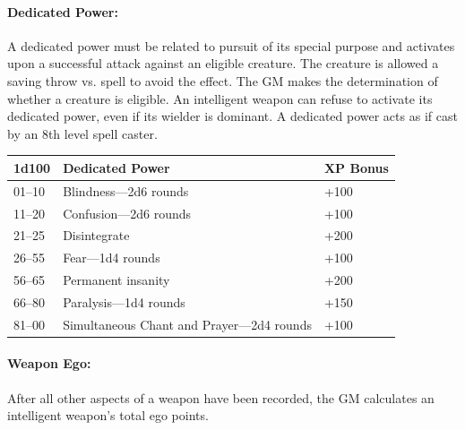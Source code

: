 \begin{multicols}{2}
\paragraph{Dedicated Power:} A dedicated power must be related to pursuit of its special purpose and activates upon a successful attack against an eligible creature.  The creature is allowed a saving throw vs. spell to avoid the effect.  The GM makes the determination of whether a creature is eligible.  An intelligent weapon can refuse to activate its dedicated power, even if its wielder is dominant.  A dedicated power acts as if cast by an 8th level spell caster.

\noindent \begin{minipage}{\columnwidth}

\label{dedicatedpowers}
\noindent \begin{tabular}{|p{}|p{}|p{}|}
\hline
1d100	& Dedicated Power	& XP Bonus \\
\hline\hline
\rowcolor[gray]{0.9}01--10	& Blindness---2d6 rounds	& +100 \\
11--20	& Confusion---2d6 rounds	& +100 \\
\rowcolor[gray]{0.9}21--25	& Disintegrate	& +200 \\
26--55	& Fear---1d4 rounds	& +100 \\
\rowcolor[gray]{0.9}56--65	& Permanent insanity	& +200 \\
66--80	& Paralysis---1d4 rounds	& +150 \\
\rowcolor[gray]{0.9}81--00	& Simultaneous Chant and Prayer---2d4 rounds	& +100 \\
\hline
\end{tabular}

\end{minipage}

\paragraph{Weapon Ego:} After all other aspects of a weapon have been recorded, the GM calculates an intelligent weapon's total ego points.  

\noindent \begin{minipage}{\columnwidth}


\end{minipage}
\end{multicols}

